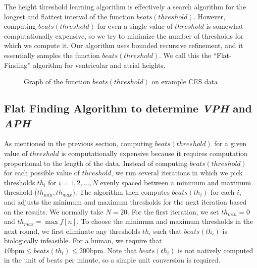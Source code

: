 \documentclass[conference]{IEEEtran}
\newcommand{\APH}{\textit{APH}}
\newcommand{\VPH}{\textit{VPH}}
\begin{document}
The height threshold learning algorithm is effectively a search algorithm for the longest and flattest
interval of the function $beats(threshold)$.
However, computing $beats(threshold)$ for even a single value of $threshold$ 
is somewhat computationally expensive,
so we try to minimize the number of thresholds for which we compute it.
Our algorithm uses bounded recursive refinement, and it essentially samples the function $beats(threshold)$.
We call this the ``Flat-Finding'' algorithm for
ventricular and atrial heights.


\begin{figure}
	\centering
	\caption{Graph of the function $beats(threshold)$ on example CES data}
	\label{fig:beats}
\end{figure}

\subsection{Flat Finding Algorithm to determine \VPH{} and \APH{}}
As mentioned in the previous section, computing $beats(threshold)$ for a given value of $threshold$
is computationally expensive because it requires computation proportional to the length of the data.
Instead of computing $beats(threshold)$ for each possible value of $threshold$, we run several iterations in which
we pick thresholds $th_i$ for $i = 1, 2, \dots, N$ evenly spaced
between a minimum and maximum threshold ($th_{min}, th_{max}$).  The algorithm then computes
$beats(th_i)$ for each $i$, and adjusts the minimum and
maximum thresholds for the next iteration based on the
results.
We normally take $N=20$.
For the first iteration, we set
$th_{min} = 0$ and $th_{max} = \max f[n]$. 
To choose the minimum and maximum thresholds in
the next round, we first eliminate any thresholds $th_i$
such that $beats(th_i)$ is biologically infeasible. %
For a human, we require that $10 \text{bpm} \le beats(th_i) \le 200 \text{bpm}$.
Note that $beats(th_i)$ is not natively computed in the unit of beats per minute, so a simple unit conversion is required.
\end{document}
